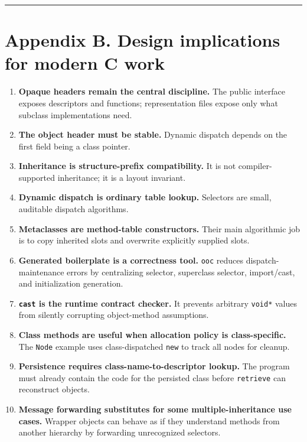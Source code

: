 \documentclass[11pt]{article}
\providecommand{\tightlist}{\setlength{\itemsep}{0pt}\setlength{\parskip}{0pt}}
\begin{document}
\begin{center}\rule{0.5\linewidth}{0.5pt}\end{center}

\section{Appendix B. Design implications for modern C
work}\label{appendix-b.-design-implications-for-modern-c-work}

\begin{enumerate}
\def\labelenumi{\arabic{enumi}.}
\tightlist
\item
  \textbf{Opaque headers remain the central discipline.} The public
  interface exposes descriptors and functions; representation files
  expose only what subclass implementations need.
\item
  \textbf{The object header must be stable.} Dynamic dispatch depends on
  the first field being a class pointer.
\item
  \textbf{Inheritance is structure-prefix compatibility.} It is not
  compiler-supported inheritance; it is a layout invariant.
\item
  \textbf{Dynamic dispatch is ordinary table lookup.} Selectors are
  small, auditable dispatch algorithms.
\item
  \textbf{Metaclasses are method-table constructors.} Their main
  algorithmic job is to copy inherited slots and overwrite explicitly
  supplied slots.
\item
  \textbf{Generated boilerplate is a correctness tool.}
  \texttt{ooc} reduces dispatch-maintenance errors by
  centralizing selector, superclass selector, import/cast, and
  initialization generation.
\item
  \textbf{\texttt{cast} is the runtime contract
  checker.} It prevents arbitrary \texttt{void*} values
  from silently corrupting object-method assumptions.
\item
  \textbf{Class methods are useful when allocation policy is
  class-specific.} The \texttt{Node} example uses
  class-dispatched \texttt{new} to track all nodes for
  cleanup.
\item
  \textbf{Persistence requires class-name-to-descriptor lookup.} The
  program must already contain the code for the persisted class before
  \texttt{retrieve} can reconstruct objects.
\item
  \textbf{Message forwarding substitutes for some multiple-inheritance
  use cases.} Wrapper objects can behave as if they understand methods
  from another hierarchy by forwarding unrecognized selectors.
\end{enumerate}
\end{document}
